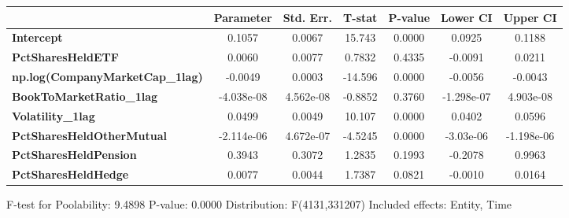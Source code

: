 \begin{center}
\begin{tabular}{lclc}
\bottomrule
\end{tabular}
\begin{tabular}{lcccccc}
                                        & \textbf{Parameter} & \textbf{Std. Err.} & \textbf{T-stat} & \textbf{P-value} & \textbf{Lower CI} & \textbf{Upper CI}  \\
\midrule
\textbf{Intercept}                      &       0.1057       &       0.0067       &      15.743     &      0.0000      &       0.0925      &       0.1188       \\
\textbf{PctSharesHeldETF}               &       0.0060       &       0.0077       &      0.7832     &      0.4335      &      -0.0091      &       0.0211       \\
\textbf{np.log(CompanyMarketCap\_1lag)} &      -0.0049       &       0.0003       &     -14.596     &      0.0000      &      -0.0056      &      -0.0043       \\
\textbf{BookToMarketRatio\_1lag}        &     -4.038e-08     &     4.562e-08      &     -0.8852     &      0.3760      &     -1.298e-07    &     4.903e-08      \\
\textbf{Volatility\_1lag}               &       0.0499       &       0.0049       &      10.107     &      0.0000      &       0.0402      &       0.0596       \\
\textbf{PctSharesHeldOtherMutual}       &     -2.114e-06     &     4.672e-07      &     -4.5245     &      0.0000      &     -3.03e-06     &     -1.198e-06     \\
\textbf{PctSharesHeldPension}           &       0.3943       &       0.3072       &      1.2835     &      0.1993      &      -0.2078      &       0.9963       \\
\textbf{PctSharesHeldHedge}             &       0.0077       &       0.0044       &      1.7387     &      0.0821      &      -0.0010      &       0.0164       \\
\bottomrule
\end{tabular}
\end{center}

F-test for Poolability: 9.4898 \newline
 P-value: 0.0000 \newline
 Distribution: F(4131,331207) \newline
  \newline
 Included effects: Entity, Time
